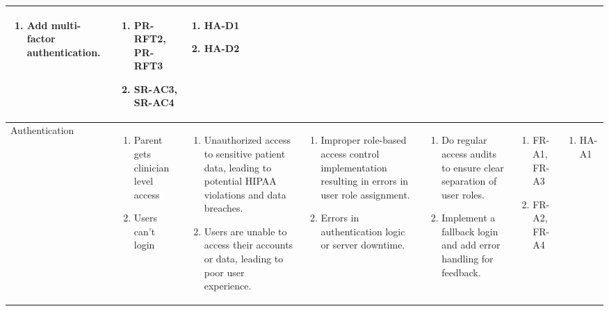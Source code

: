 \documentclass{article}
\begin{document}
\begin{landscape}
\begin{longtable}{|p{3cm}|p{3cm}|p{4cm}|p{4cm}|p{3cm}|p{2cm}|p{3cm}|}
\begin{enumerate}[leftmargin=*]
       \item Add multi-factor authentication.
  \end{enumerate} &
  \begin{enumerate}[leftmargin=*]
       \item PR-RFT2, PR-RFT3
       \item SR-AC3, SR-AC4
  \end{enumerate} &
  \begin{enumerate}[leftmargin=*]
       \item HA-D1
       \item HA-D2
  \end{enumerate} \\
  \hline
  Authentication & 
  \begin{enumerate}[leftmargin=*]
      \item Parent gets clinician level access
      \item Users can't login
  \end{enumerate} & 
  \begin{enumerate}[leftmargin=*]
      \item Unauthorized access to sensitive patient data, leading to potential HIPAA violations and data breaches.
      \item Users are unable to access their accounts or data, leading to poor user experience.
  \end{enumerate} &
  \begin{enumerate}[leftmargin=*]
       \item Improper role-based access control implementation resulting in errors in user role assignment.
       \item Errors in authentication logic or server downtime.
  \end{enumerate} &
  \begin{enumerate}[leftmargin=*]
       \item Do regular access audits to ensure clear separation of user roles.
       \item Implement a fallback login and add error handling for feedback.
  \end{enumerate} &
  \begin{enumerate}[leftmargin=*]
       \item FR-A1, FR-A3
       \item FR-A2, FR-A4
  \end{enumerate} &
  \begin{enumerate}[leftmargin=*]
       \item HA-A1

\end{enumerate}
\end{longtable}
\end{landscape}
\end{document}
